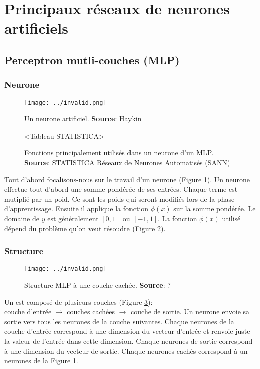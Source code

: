 \documentclass[12pt,a4paper,oneside, titlepage]{article}
\begin{document}
\section{Principaux réseaux de neurones artificiels}
\terminologie
\subsection{Perceptron mutli-couches (MLP)}
\subsubsection*{Neurone}
\begin{figure}
 \centering
 \texttt{[image: ../invalid.png]}
 \caption{Un neurone artificiel. \textbf{Source}: Haykin\cite{Haykin}}
 \label{neuronemlp}
\end{figure}
\begin{figure}
 \centering
 <Tableau STATISTICA>
 \caption{Fonctions principalement utilisés dans un neurone d'un MLP. \textbf{Source}: STATISTICA Réseaux de Neurones Automatisés (SANN)\cite{statistica}}
 \label{mlpfonc}
\end{figure}
Tout d'abord focalisons-nous sur le travail d'un neurone (Figure \ref{neuronemlp}).
Un neurone effectue tout d'abord une somme pondérée de ses entrées.
Chaque terme est mutiplié par un poid. Ce sont les poids qui seront modifiés lors de la phase d'apprentissage.
Ensuite il applique la fonction $\phi(x)$ sur la somme pondérée.%
Le domaine de $y$ est généralement $[0,1]$ ou $[-1,1]$.\cite{Haykin}
La fonction $\phi(x)$ utilisé dépend du problème qu'on veut résoudre (Figure \ref{mlpfonc}).
\subsubsection*{Structure}
\begin{figure}
 \centering
 \texttt{[image: ../invalid.png]}
 \caption{Structure MLP à une couche cachée. \textbf{Source}: ?}
 \label{structuremlp}
\end{figure}
Un \mlp est composé de plusieurs couches (Figure \ref{structuremlp}):\\
couche d'entrée $\rightarrow$ couches cachées $\rightarrow$ couche de sortie.
Un neurone envoie sa sortie vers tous les neurones de la couche suivantes.
Chaque neurones de la couche d'entrée correspond à une dimension du vecteur d'entrée et renvoie juste la valeur de l'entrée dans cette dimension.
Chaque neurones de sortie correspond à une dimension du vecteur de sortie.
Chaque neurones cachés correspond à un neurones de la Figure \ref{neuronemlp}.
\end{document}
